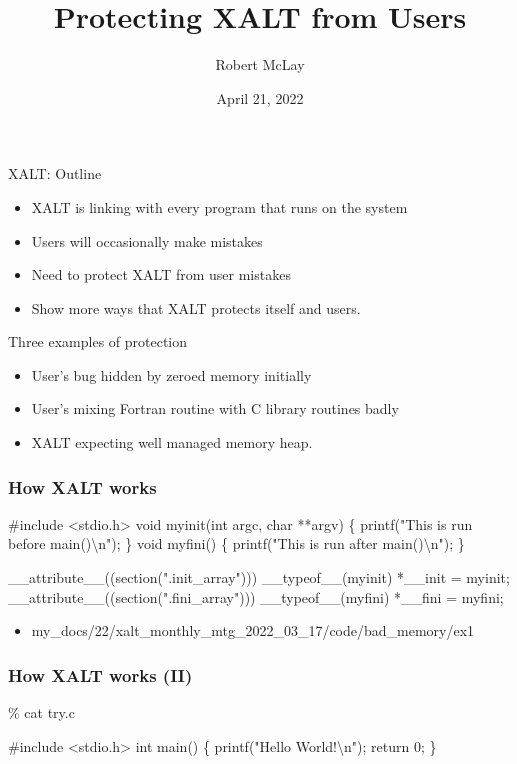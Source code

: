 \documentclass{beamer}
\begin{document}
\title[XALT]{Protecting XALT from Users}
\author{Robert McLay}
\date{April 21, 2022}

\frame{\titlepage}

\begin{frame}{XALT: Outline}
  \begin{itemize}
    \item XALT is linking with every program that runs on the system
    \item Users will occasionally make mistakes
    \item Need to protect XALT from user mistakes
    \item Show more ways that XALT protects itself and users.
  \end{itemize}
\end{frame}

\begin{frame}{Three examples of protection}
  \begin{itemize}
    \item User's bug hidden by zeroed memory initially
    \item User's mixing Fortran routine with C library routines badly
    \item XALT expecting well managed memory heap.
  \end{itemize}
\end{frame}


\begin{frame}[fragile]
    \frametitle{How XALT works}
 {\tiny
    \begin{semiverbatim}
#include <stdio.h>
void myinit(int argc, char **argv)
\{ printf("This is run before main()\textbackslash{}n"); \}
void myfini()
\{ printf("This is run after main()\textbackslash{}n"); \}

__attribute__((section(".init_array"))) __typeof__(myinit) *__init = myinit;
__attribute__((section(".fini_array"))) __typeof__(myfini) *__fini = myfini;
    \end{semiverbatim}
}
  \begin{itemize}
    \item my\_docs/22/xalt\_monthly\_mtg\_2022\_03\_17/code/bad\_memory/ex1
  \end{itemize}
\end{frame}

\begin{frame}[fragile]
    \frametitle{How XALT works (II)}
 {\small
    \begin{semiverbatim}
\% cat try.c

#include <stdio.h>
int main()
\{
  printf("Hello World!\textbackslash{}n");
  return 0;
\}

    \end{semiverbatim}
}
\end{frame}
\end{document}
